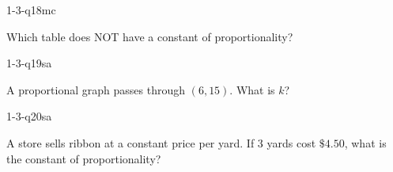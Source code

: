 \begin{practiceQuestion}{1-3-q18}{mc}
\begin{questionText}
Which table does NOT have a constant of proportionality?
\end{questionText}
\end{practiceQuestion}


\begin{practiceQuestion}{1-3-q19}{sa}
\begin{questionText}
A proportional graph passes through $(6, 15)$. What is $k$?
\end{questionText}
\end{practiceQuestion}

\begin{practiceQuestion}{1-3-q20}{sa}
\begin{questionText}
A store sells ribbon at a constant price per yard. If $3$ yards cost $\$4.50$, what is the constant of proportionality?
\end{questionText}
\end{practiceQuestion}

